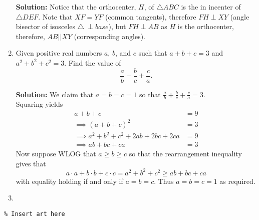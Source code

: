 \documentclass{article}
\begin{document}
\begin{enumerate}[itemsep=\fill]
\textbf{Solution:} Notice that the orthocenter, $H$, of $\triangle ABC$ is the in incenter of $\triangle DEF$. Note that $XF=YF$ (common tangents), therefore $FH \perp XY$ (angle bisector of isosceles $\triangle\ \perp base$), but $FH \perp AB$ as $H$ is the orthocenter, therefore, $AB || XY$ (corresponding angles).

\item %
Given positive real numbers $a$, $b$, and $c$ such that $a+b+c = 3$ and $a^2+b^2+c^2 = 3$. Find the value of \[\frac{a}{b} +\frac{b}{c} +\frac{c}{a}.\]

\textbf{Solution:} We claim that $a=b=c=1$ so that $\frac{a}{b} +\frac{b}{c} +\frac{c}{a} = 3$. 
\\ Squaring yields 
\begin{align*}
	a+b+c &= 9
	\\ \implies (a+b+c)^2 &= 3
	\\ \implies a^2+b^2+c^2 + 2ab + 2bc + 2ca &= 9
	\\ \implies ab + bc + ca &= 3
\end{align*}
Now suppose WLOG that $a \geq b \geq c$ so that the rearrangement inequality gives that
$$a \cdot a + b \cdot b + c \cdot c = a^2+b^2+c^2 \geq ab + bc +ca$$
with equality holding if and only if $a=b=c$. 
Thus $a=b=c=1$ as required. 

\item %


\end{enumerate}


\centering
\small
\begin{BVerbatim}
\end{BVerbatim}
\end{document}
